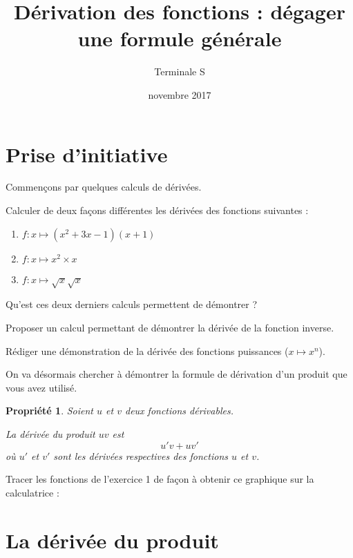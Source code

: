 \documentclass[12pt,a4paper,french]{article}
\title{Dérivation des fonctions : dégager une formule générale}
\author{Terminale S}
\date{novembre 2017}
\makeatletter
\renewcommand{\maketitle}%
{\framebox{%
    \begin{minipage}{1.0\linewidth}%
      \begin{center}%
        \Large \@title ~-- \@author \\%
        \@date%
      \end{center}%
    \end{minipage}}%
  \normalsize%
}
\theoremstyle{break}
\newtheorem{propriete}{Propriété}
\theoremstyle{plain}
\theoremstyle{nonumberplain}
\theoremstyle{nonumberbreak}
\makeatother
\begin{document}
\maketitle

\section{Prise d'initiative}

Commençons par quelques calculs de dérivées.

\begin{question}
  Calculer de deux façons différentes les dérivées des fonctions
  suivantes :
  \begin{enumerate}
    \item $f:x\mapsto (x^2 + 3x -1)(x + 1)$
    \item $f:x\mapsto x^2\times x$
    \item $f:x\mapsto \sqrt{x}\sqrt{x}$
  \end{enumerate}
\end{question}

Qu'est ces deux derniers calculs permettent de démontrer ?

Proposer un calcul permettant de démontrer la dérivée de la fonction
inverse.

Rédiger une démonstration de la dérivée des fonctions puissances
($x\mapsto x^n$).

On va désormais chercher à démontrer la formule de dérivation d'un
produit que vous avez utilisé.

\begin{propriete}
  Soient $u$ et $v$ deux fonctions dérivables.

  La dérivée du produit $uv$ est \[u'v + uv'\] où $u'$ et $v'$ sont les
  dérivées respectives des fonctions $u$ et $v$.
\end{propriete}

Tracer les fonctions de l'exercice 1 de façon à obtenir ce graphique sur
la calculatrice :
\begin{center}
\end{center}


\pagebreak
\section{La dérivée du produit}
\end{document}
